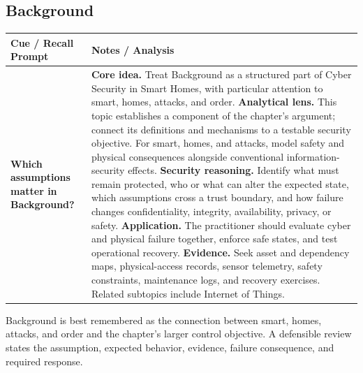 \documentclass[11pt]{article}
\newcommand{\CornellHeader}{%
\rowcolor{Navy}\color{white}\bfseries Cue / Recall Prompt & \color{white}\bfseries Notes / Analysis\\\hline}
\newcommand{\CornellRow}[2]{%
\cellcolor{CueGray}\RaggedRight\textbf{#1} & \RaggedRight #2\\\hline}
\begin{document}
\subsection*{Background}
\begin{longtable}{>{\RaggedRight\arraybackslash}p{}|>{\RaggedRight\arraybackslash}p{}}
\CornellHeader
\CornellRow{Which assumptions matter in Background?}{\textbf{Core idea.} Treat Background as a structured part of Cyber Security in Smart Homes, with particular attention to smart, homes, attacks, and order. \textbf{Analytical lens.} This topic establishes a component of the chapter's argument; connect its definitions and mechanisms to a testable security objective. For smart, homes, and attacks, model safety and physical consequences alongside conventional information-security effects. \textbf{Security reasoning.} Identify what must remain protected, who or what can alter the expected state, which assumptions cross a trust boundary, and how failure changes confidentiality, integrity, availability, privacy, or safety. \textbf{Application.} The practitioner should evaluate cyber and physical failure together, enforce safe states, and test operational recovery. \textbf{Evidence.} Seek asset and dependency maps, physical-access records, sensor telemetry, safety constraints, maintenance logs, and recovery exercises. Related subtopics include Internet of Things.}
\end{longtable}
\begin{topicsummary}
Background is best remembered as the connection between smart, homes, attacks, and order and the chapter's larger control objective. A defensible review states the assumption, expected behavior, evidence, failure consequence, and required response.
\end{topicsummary}
\end{document}
